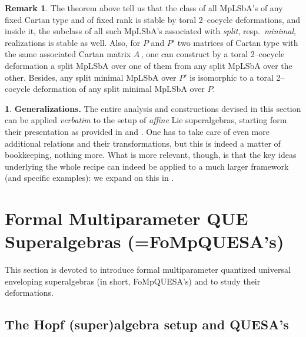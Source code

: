 \documentclass[12pt,reqno,twoside,a4paper]{amsart}
\numberwithin{equation}{section}
\theoremstyle{definition}
\newtheorem{rmk}[lema]{Remark}
\newtheorem{free text}[lema]{}
\theoremstyle{remark}
\theoremstyle{plain}
\begin{document}
\vskip9pt

\begin{rmk}
%
 The theorem above tell us that the class of all MpLSbA's of any fixed Cartan type and of fixed rank is stable by toral 2--cocycle deformations, and inside it, the subclass of all such MpLSbA's associated with \textsl{split},  resp.\  \textsl{minimal},  realizations is stable as well.  Also, for
$ P $  and  $ P' $  two matrices of Cartan type with the same associated Cartan matrix $ A \, $,  one can construct by a toral 2--cocycle deformation a split MpLSbA over one of them from any split MpLSbA over the other.  Besides, any split minimal MpLSbA over  $ P' $ is isomorphic to a toral 2--cocycle deformation of any split minimal MpLSbA over  $ P $.
%
\end{rmk}

\vskip3pt

\begin{free text}  \label{gener_GaGa-alg.'s}
%
 \textbf{Generalizations.}  The entire analysis and constructions devised in this section can be applied  \textit{verbatim\/}  to the setup of  \textsl{affine\/}  Lie superalgebras, starting form their presentation as provided in \cite{Ya2}  and  \cite{Ya3}.  One has to take care of even more additional relations and their transformations, but this is indeed a matter of bookkeeping, nothing more.  What is more relevant, though, is that the key ideas underlying the whole recipe can indeed be applied to a much larger framework (and specific examples): we expand on this in  \cite{GG5}.
%
\end{free text}

\bigskip
 \vskip13pt


\section{Formal Multiparameter QUE Superalgebras (=FoMpQUESA's)}  \label{sec: FoMpQUESA's}
%
 \vskip7pt
%

   This section is devoted to introduce formal multiparameter quantized universal enveloping superalgebras (in short, FoMpQUESA's) and to study their deformations.
%
 \vskip15pt
%


\subsection{The Hopf (super)algebra setup and QUESA's}  \label{sec: Hopf-setup & QUEA's}  {\ }

\vskip7pt
\end{document}
